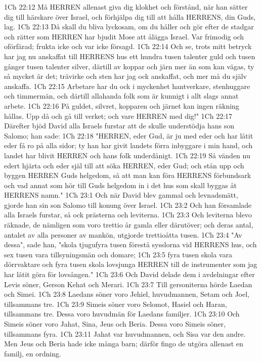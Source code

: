 1Ch 22:12  Må HERREN allenast giva dig klokhet och förstånd, när han sätter dig till härskare över Israel, och förhjälpa dig till att hålla HERRENS, din Guds, lag.
1Ch 22:13  Då skall du bliva lyckosam, om du håller och gör efter de stadgar och rätter som HERREN har bjudit Mose att ålägga Israel. Var frimodig och oförfärad; frukta icke och var icke försagd.
1Ch 22:14  Och se, trots mitt betryck har jag nu anskaffat till HERRENS hus ett hundra tusen talenter guld och tusen gånger tusen talenter silver, därtill av koppar och järn mer än som kan vägas, ty så mycket är det; trävirke och sten har jag ock anskaffat, och mer må du själv anskaffa.
1Ch 22:15  Arbetare har du ock i myckenhet hantverkare, stenhuggare och timmermän, och därtill allahanda folk som är kunnigt i allt slags annat arbete.
1Ch 22:16  På guldet, silvret, kopparen och järnet kan ingen räkning hållas. Upp då och gå till verket; och vare HERREN med dig!"
1Ch 22:17  Därefter bjöd David alla Israels furstar att de skulle understödja hans son Salomo; han sade:
1Ch 22:18  "HERREN, eder Gud, är ju med eder och har låtit eder få ro på alla sidor; ty han har givit landets förra inbyggare i min hand, och landet har blivit HERREN och hans folk underdånigt.
1Ch 22:19  Så vänden nu edert hjärta och eder själ till att söka HERREN, eder Gud; och stån upp och byggen HERREN Guds helgedom, så att man kan föra HERRENS förbundsark och vad annat som hör till Guds helgedom in i det hus som skall byggas åt HERRENS namn."
1Ch 23:1  Och när David blev gammal och levnadsmätt, gjorde han sin son Salomo till konung över Israel.
1Ch 23:2  Och han församlade alla Israels furstar, så ock prästerna och leviterna.
1Ch 23:3  Och leviterna blevo räknade, de nämligen som voro trettio år gamla eller därutöver; och deras antal, antalet av alla personer av mankön, utgjorde trettioåtta tusen.
1Ch 23:4  "Av dessa", sade han, "skola tjugufyra tusen förestå sysslorna vid HERRENS hus, och sex tusen vara tillsyningsmän och domare;
1Ch 23:5  fyra tusen skola vara dörrvaktare och fyra tusen skola lovsjunga HERREN till de instrumenter som jag har låtit göra för lovsången."
1Ch 23:6  Och David delade dem i avdelningar efter Levis söner, Gerson Kehat och Merari.
1Ch 23:7  Till gersoniterna hörde Laedan och Simei.
1Ch 23:8  Laedans söner voro Jehiel, huvudmannen, Setam och Joel, tillsammans tre.
1Ch 23:9  Simeis söner voro Selomot, Hasiel och Haran, tillsammans tre. Dessa voro huvudmän för Laedans familjer.
1Ch 23:10  Och Simeis söner voro Jahat, Sina, Jeus och Beria. Dessa voro Simeis söner, tillsammans fyra.
1Ch 23:11  Jahat var huvudmannen, och Sisa var den andre. Men Jeus och Beria hade icke många barn; därför fingo de utgöra allenast en familj, en ordning.
